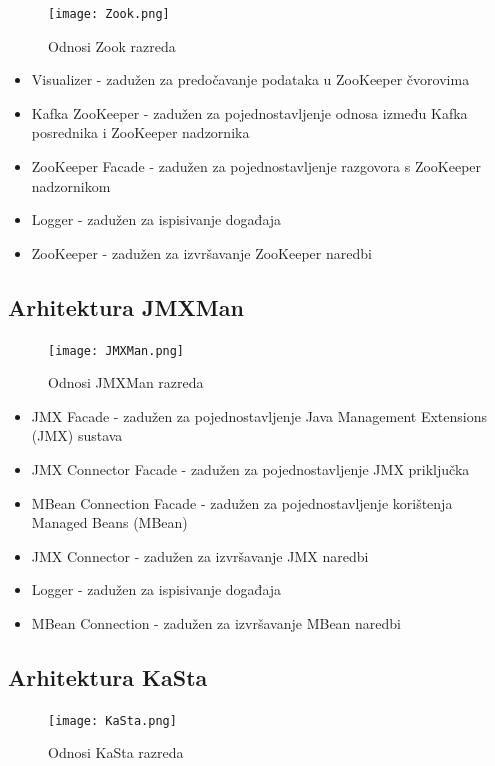 \documentclass[utf8, diplomski, lmodern, numeric]{fer}
\begin{document}
\begin{figure}[H]
    \centering
    \texttt{[image: Zook.png]}
    \caption{Odnosi Zook razreda}
    \label{fig:zookeeper-kafka}
\end{figure}

\begin{itemize}
    \item Visualizer - zadužen za predočavanje podataka u ZooKeeper čvorovima
    \item Kafka ZooKeeper - zadužen za pojednostavljenje odnosa između Kafka posrednika i ZooKeeper nadzornika
    \item ZooKeeper Facade - zadužen za pojednostavljenje razgovora s ZooKeeper nadzornikom
    \item Logger - zadužen za ispisivanje događaja
    \item ZooKeeper - zadužen za izvršavanje ZooKeeper naredbi
\end{itemize}

\subsection{Arhitektura JMXMan}

\begin{figure}[H]
    \centering
    \texttt{[image: JMXMan.png]}
    \caption{Odnosi JMXMan razreda}
    \label{fig:jmx-client}
\end{figure}

\begin{itemize}
    \item JMX Facade - zadužen za pojednostavljenje Java Management Extensions (JMX) sustava
    \item JMX Connector Facade - zadužen za pojednostavljenje JMX priključka
    \item MBean Connection Facade - zadužen za pojednostavljenje korištenja Managed Beans (MBean)
    \item JMX Connector - zadužen za izvršavanje JMX naredbi
    \item Logger - zadužen za ispisivanje događaja
    \item MBean Connection - zadužen za izvršavanje MBean naredbi
\end{itemize}

\subsection{Arhitektura KaSta}

\begin{figure}[H]
    \centering
    \texttt{[image: KaSta.png]}
    \caption{Odnosi KaSta razreda}
    \label{fig:kafka-metrics-reporter}
\end{figure}
\end{document}
